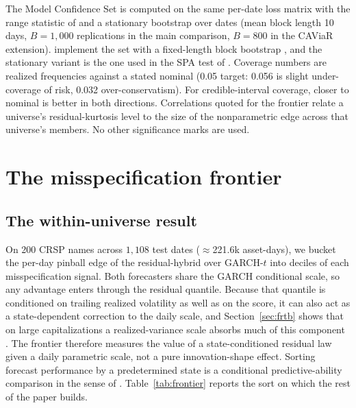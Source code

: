 \documentclass[11pt]{article}
\theoremstyle{remark}
\begin{document}
The Model Confidence Set is
computed on the same per-date loss matrix with the range statistic of \citet{hansen2011mcs} and a
stationary bootstrap over dates \citep{politisromano1994} (mean block length 10 days, $B=1{,}000$ replications
in the main comparison, $B=800$ in the CAViaR extension).
\citet{hansen2011mcs} implement the set with a fixed-length block bootstrap \citep{kunsch1989block}, and the stationary variant is the one used in the SPA test of \citet{hansen2005spa}. Coverage
numbers are realized frequencies against a stated nominal (0.05 target:
0.056 is slight under-coverage of risk, 0.032 over-conservatism). For
credible-interval coverage, closer to nominal is better in both
directions. Correlations quoted for the frontier relate a universe's
residual-kurtosis level to the size of the nonparametric edge across
that universe's members. No other significance marks are used.

\section{The misspecification frontier}\label{sec:frontier}

\subsection{The within-universe result}

On 200 CRSP names across $1{,}108$ test dates ($\approx$221.6k asset-days), we bucket the per-day
pinball edge of the residual-hybrid over GARCH-$t$ into
deciles of each misspecification signal. Both forecasters share the GARCH conditional scale, so any advantage enters through the residual quantile. Because that quantile is conditioned on trailing realized volatility as well as on the score, it can also act as a state-dependent correction to the daily scale, and Section~\ref{sec:frtb} shows that on large capitalizations a realized-variance scale absorbs much of this component \citep{andersenbollerslev1998, hansenlunde2005}. The frontier therefore measures the value of a state-conditioned residual law given a daily parametric scale, not a pure innovation-shape effect. Sorting
forecast performance by a predetermined state is a conditional
predictive-ability comparison in the sense of \citet{giacominiwhite2006}.
Table~\ref{tab:frontier} reports the sort on which the rest of the paper builds.
\end{document}

